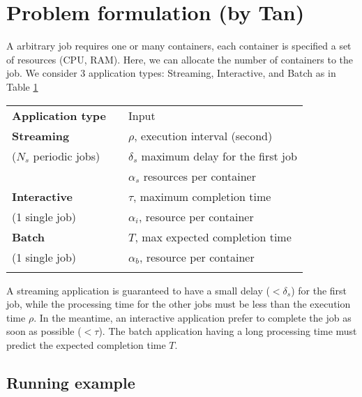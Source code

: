\section{Problem formulation (by Tan)}

A arbitrary job requires one or many containers, each container is specified a set of resources (CPU, RAM). Here, we can allocate the number of containers to the job. We consider 3 application types: Streaming, Interactive, and Batch as in Table \ref{tbl:application_type}

\begin{table}[!htp]
	\centering
	\begin{tabular}{@{}lll@{}}
		\toprule\addlinespace
		\textbf{Application type} & & Input \\ \addlinespace
		\cmidrule{1-3}\addlinespace
		\textbf{Streaming}      &  & $\rho$, execution interval (second)\\
		($N_s$ periodic jobs)	&  & $\delta_s$ maximum delay for the first job\\
				&                       & $\alpha_s$ resources per container \\ \addlinespace 

		\textbf{Interactive}    &          & $\tau$, maximum completion time\\
		(1 single job) 			&  						& $\alpha_i$, resource per container \\ \addlinespace
		
		\textbf{Batch}  &          & $T$, max expected completion time\\
		(1 single job)	& 		   &  $\alpha_b$, resource per container\\ \addlinespace
		\bottomrule
	\end{tabular}
	\label{tbl:application_type}
\end{table}

A streaming application is guaranteed to have a small delay ($<\delta_s$) for the first job, while the processing time for the other jobs must be less than the execution time $\rho$. In the meantime, an interactive application prefer to complete the job as soon as possible ($<\tau$). The batch application having a long processing time must predict the expected completion time $T$. 

\subsection{Running example}

